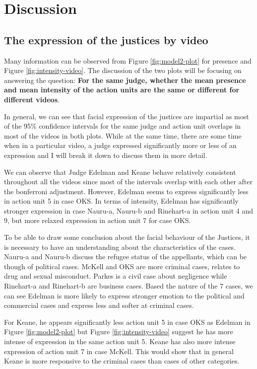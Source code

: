 \documentclass{monashthesis}
\begin{document}
\hypertarget{discussion}{%
\chapter{Discussion}\label{discussion}}

\hypertarget{the-expression-of-the-justices-by-video}{%
\section{The expression of the justices by video}\label{the-expression-of-the-justices-by-video}}

Many information can be observed from Figure \ref{fig:model2-plot} for presence and Figure \ref{fig:intensity-video}. The discussion of the two plots will be focusing on answering the question: \textbf{For the same judge, whether the mean presence and mean intensity of the action units are the same or different for different videos}.

In general, we can see that facial expression of the justices are impartial as most of the 95\% confidence intervals for the same judge and action unit overlaps in most of the videos in both plots. While at the same time, there are some time when in a particular video, a judge expressed significantly more or less of an expression and I will break it down to discuss them in more detail.

We can observe that Judge Edelman and Keane behave relatively consistent throughout all the videos since most of the intervals overlap with each other after the bonferroni adjustment. However, Edelman seems to express significantly less in action unit 5 in case OKS. In terms of intensity, Edelman has significantly stronger expression in case Nauru-a, Nauru-b and Rinehart-a in action unit 4 and 9, but more relaxed expression in action unit 7 for case OKS.

To be able to draw some conclusion about the facial behaviour of the Justices, it is necessary to have an understanding about the characteristics of the cases. Nauru-a and Nauru-b discuss the refugee status of the appellants, which can be though of political cases. McKell and OKS are more criminal cases, relates to drug and sexual misconduct. Parkes is a civil case about negligence while Rinehart-a and Rinehart-b are business cases. Based the nature of the 7 cases, we can see Edelman is more likely to express stronger emotion to the political and commercial cases and express less and softer at criminal cases.

For Keane, he appears significantly less action unit 5 in case OKS as Edelman in Figure \ref{fig:model2-plot} but Figure \ref{fig:intensity-video} suggest he has more intense of expression in the same action unit 5. Keane has also more intense expression of action unit 7 in case McKell. This would show that in general Keane is more responsive to the criminal cases than cases of other categories.
\end{document}
